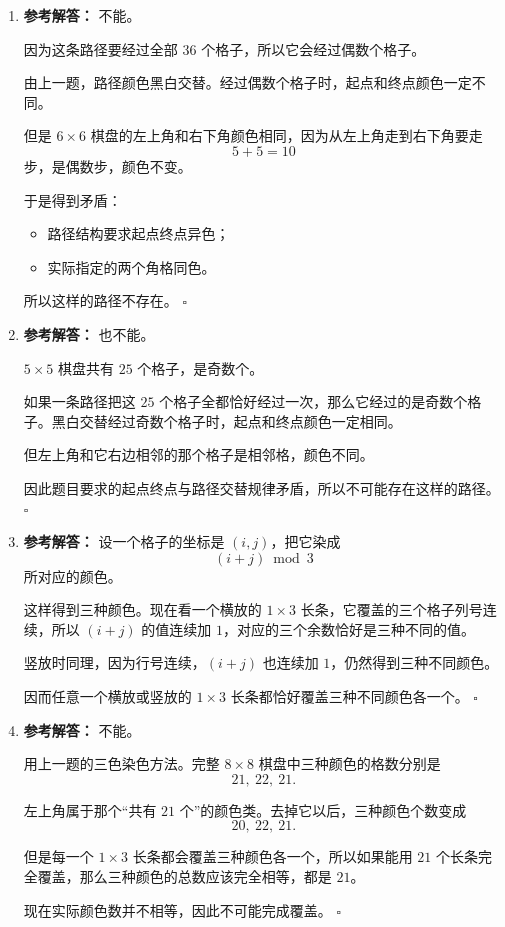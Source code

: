 \documentclass[11pt,a4paper,fontset=fandol]{ctexart}
\newenvironment{solution}{\par\noindent\textbf{参考解答：}}{\hfill$\square$\par}
\begin{document}
\begin{enumerate}
\begin{solution}
  也就是说，路径上经过的格子颜色一定黑白交替。
  \end{solution}

  \item \begin{solution}
  不能。

  因为这条路径要经过全部 $36$ 个格子，所以它会经过偶数个格子。

  由上一题，路径颜色黑白交替。经过偶数个格子时，起点和终点颜色一定不同。

  但是 $6\times 6$ 棋盘的左上角和右下角颜色相同，因为从左上角走到右下角要走
  \[
  5+5=10
  \]
  步，是偶数步，颜色不变。

  于是得到矛盾：
  \begin{itemize}
    \item 路径结构要求起点终点异色；
    \item 实际指定的两个角格同色。
  \end{itemize}

  所以这样的路径不存在。
  \end{solution}

  \item \begin{solution}
  也不能。

  $5\times 5$ 棋盘共有 $25$ 个格子，是奇数个。

  如果一条路径把这 $25$ 个格子全都恰好经过一次，那么它经过的是奇数个格子。黑白交替经过奇数个格子时，起点和终点颜色一定相同。

  但左上角和它右边相邻的那个格子是相邻格，颜色不同。

  因此题目要求的起点终点与路径交替规律矛盾，所以不可能存在这样的路径。
  \end{solution}

  \item \begin{solution}
  设一个格子的坐标是 $(i,j)$，把它染成
  \[
  (i+j)\bmod 3
  \]
  所对应的颜色。

  这样得到三种颜色。现在看一个横放的 $1\times 3$ 长条，它覆盖的三个格子列号连续，所以 $(i+j)$ 的值连续加 $1$，对应的三个余数恰好是三种不同的值。

  竖放时同理，因为行号连续，$(i+j)$ 也连续加 $1$，仍然得到三种不同颜色。

  因而任意一个横放或竖放的 $1\times 3$ 长条都恰好覆盖三种不同颜色各一个。
  \end{solution}

  \item \begin{solution}
  不能。

  用上一题的三色染色方法。完整 $8\times 8$ 棋盘中三种颜色的格数分别是
  \[
  21,\ 22,\ 21.
  \]

  左上角属于那个“共有 $21$ 个”的颜色类。去掉它以后，三种颜色个数变成
  \[
  20,\ 22,\ 21.
  \]

  但是每一个 $1\times 3$ 长条都会覆盖三种颜色各一个，所以如果能用 $21$ 个长条完全覆盖，那么三种颜色的总数应该完全相等，都是 $21$。

  现在实际颜色数并不相等，因此不可能完成覆盖。
  \end{solution}
\end{enumerate}
\end{document}
